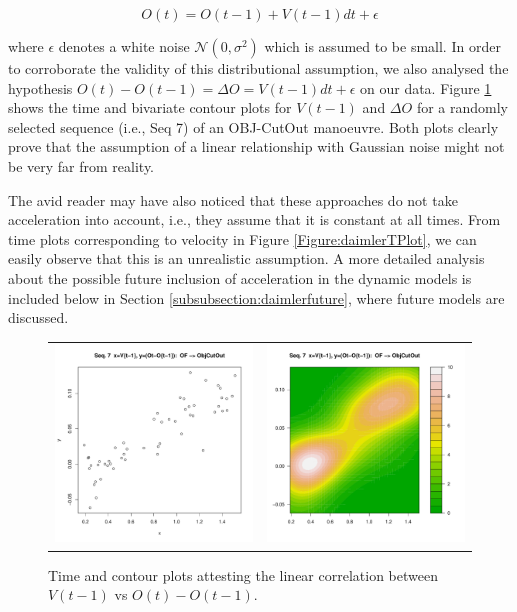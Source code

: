 \begin{equation}
O(t) =O(t-1) +V(t-1)dt +\epsilon
\end{equation}

where $\epsilon$ denotes a white noise $\mathcal{N}(0,\sigma^2)$ which is assumed to be small. In order to corroborate the validity of this distributional assumption, we also analysed the hypothesis $O(t) - O(t-1) = \Delta O = V(t-1)dt +\epsilon$ on our data. Figure \ref{Figure:daimlerVvsOffs} shows the time and bivariate contour plots for $V(t-1)$ and $\Delta O$ for a randomly selected sequence (i.e., Seq 7) of an OBJ-CutOut manoeuvre. Both plots clearly prove that the assumption of a linear relationship with Gaussian noise might not be very far from reality.

The avid reader may have also noticed that these approaches do not take acceleration into account, i.e., they assume that it is constant at all times. From time plots corresponding to velocity in Figure \ref{Figure:daimlerTPlot}, we can easily observe that this is an unrealistic assumption. A more detailed analysis about the possible future inclusion of acceleration in the dynamic models is included below in Section \ref{subsubsection:daimlerfuture}, where future models are discussed.

\begin{figure}[ht!]
  \centering
  \setlength{\tabcolsep}{0.05pt}
  \renewcommand{\arraystretch}{0.02}
    \begin{tabular}{cc}
    \includegraphics[width=60mm]{figures/DaimlerOBJplotSerie7.pdf}&
    \includegraphics[width=60mm]{figures/DaimlerOBJcontourSerie7.pdf}\\
  \end{tabular}
      \caption{ \label{Figure:daimlerVvsOffs}Time and contour plots attesting the linear correlation between $V(t-1)$ vs $O(t) - O(t-1)$.}
\end{figure}

